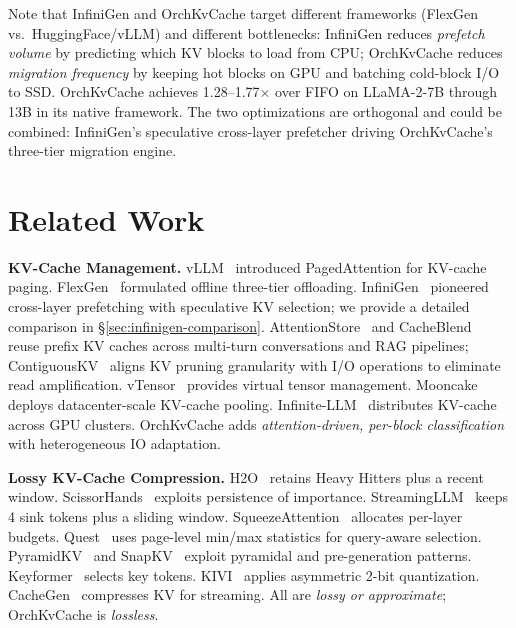 \documentclass[conference]{IEEEtran}
\begin{document}
Note that InfiniGen and OrchKvCache target different frameworks (FlexGen vs.\ HuggingFace/vLLM) and different bottlenecks: InfiniGen reduces \emph{prefetch volume} by predicting which KV blocks to load from CPU; OrchKvCache reduces \emph{migration frequency} by keeping hot blocks on GPU and batching cold-block I/O to SSD.  OrchKvCache achieves 1.28--1.77$\times$ over FIFO on LLaMA-2-7B through 13B in its native framework.  The two optimizations are orthogonal and could be combined: InfiniGen's speculative cross-layer prefetcher driving OrchKvCache's three-tier migration engine.

\section{Related Work}

\textbf{KV-Cache Management.} vLLM~\cite{vllm} introduced PagedAttention for KV-cache paging. FlexGen~\cite{flexgen} formulated offline three-tier offloading. InfiniGen~\cite{infinigen} pioneered cross-layer prefetching with speculative KV selection; we provide a detailed comparison in \S\ref{sec:infinigen-comparison}. AttentionStore~\cite{attentionstore} and CacheBlend~\cite{cacheblend} reuse prefix KV caches across multi-turn conversations and RAG pipelines; ContiguousKV~\cite{contiguouskv} aligns KV pruning granularity with I/O operations to eliminate read amplification. vTensor~\cite{vtensor} provides virtual tensor management. Mooncake~\cite{mooncake} deploys datacenter-scale KV-cache pooling. Infinite-LLM~\cite{infinitellm} distributes KV-cache across GPU clusters. OrchKvCache adds \emph{attention-driven, per-block classification} with heterogeneous IO adaptation.

\textbf{Lossy KV-Cache Compression.} H2O~\cite{h2o} retains Heavy Hitters plus a recent window. ScissorHands~\cite{scissorhands} exploits persistence of importance. StreamingLLM~\cite{streamingllm} keeps 4 sink tokens plus a sliding window. SqueezeAttention~\cite{squeezeattention} allocates per-layer budgets. Quest~\cite{quest} uses page-level min/max statistics for query-aware selection. PyramidKV~\cite{pyramidkv} and SnapKV~\cite{snapkv} exploit pyramidal and pre-generation patterns. Keyformer~\cite{keyformer} selects key tokens. KIVI~\cite{kivi} applies asymmetric 2-bit quantization. CacheGen~\cite{cachegen} compresses KV for streaming. All are \emph{lossy or approximate}; OrchKvCache is \emph{lossless}.
\end{document}

